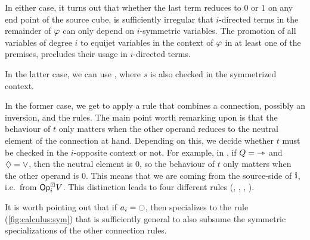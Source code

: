 \documentclass[a4paper]{memoir}
\begin{document}
In either case, it turns out that whether the last term reduces to $0$ or $1$ on any end point of the source cube, is sufficiently irregular that $i$-directed terms in the remainder of $\varphi$ can only depend on $i$-symmetric variables.
The promotion of all variables of degree $i$ to equijet variables in the context of $\varphi$ in at least one of the premises, precludes their usage in $i$-directed terms.

In the latter case, we can use , where $s$ is also checked in the symmetrized context.

In the former case, we get to apply a rule that combines a connection, possibly an inversion, and the  rules.
The main point worth remarking upon is that the behaviour of $t$ only matters when the other operand reduces to the neutral element of the connection at hand.
Depending on this, we decide whether $t$ must be checked in the $i$-opposite context or not.
For example, in , if $Q = {\rightarrowtriangle}$ and $\mathbin{\diamondsuit} = \vee$, then the neutral element is $0$, so the behaviour of $t$ only matters when the other operand is $0$.
This means that we are coming from the source-side of $\mathbf{i}$, i.e.\ from ${\mathsf{Op}}^\boxdot_i V$.
This distinction leads to four different rules (, , , ).

It is worth pointing out that if $a_i = \npolar$, then  specializes to the rule  (\cref{fig:calculus:sym}) that is sufficiently general to also subsume the symmetric specializations of the other connection rules.
\end{document}
